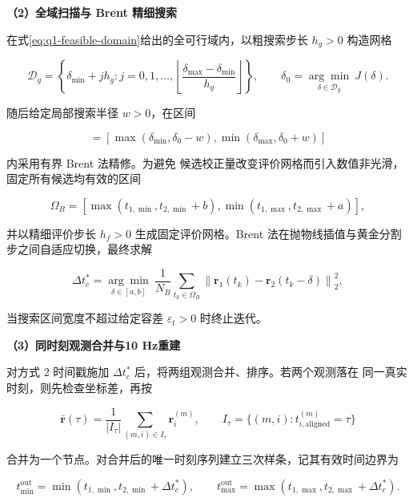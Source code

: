 \noindent\textbf{（2）全域扫描与 Brent 精细搜索}

在式\eqref{eq:q1-feasible-domain}给出的全可行域内，以粗搜索步长 \(h_g>0\)
构造网格

\begin{equation}
\mathcal D_g=\left\{\delta_{\min}+jh_g:
j=0,1,\ldots,
\left\lfloor\frac{\delta_{\max}-\delta_{\min}}{h_g}\right\rfloor\right\},
\qquad
\delta_0=\underset{\delta\in\mathcal D_g}{\arg\min}\ J(\delta).
\label{eq:q1-coarse-seed}
\end{equation}

随后给定局部搜索半径 \(w>0\)，在区间

\begin{equation}
[a,b]=\left[\max(\delta_{\min},\delta_0-w),
\min(\delta_{\max},\delta_0+w)\right]
\label{eq:q1-brent-bracket}
\end{equation}

内采用有界 Brent 法精修。为避免
候选校正量改变评价网格而引入数值非光滑，固定所有候选均有效的区间

\begin{equation}
\Omega_B=
\left[
\max(t_{1,\min},t_{2,\min}+b),
\min(t_{1,\max},t_{2,\max}+a)
\right],
\label{eq:q1-brent-overlap}
\end{equation}

并以精细评价步长 \(h_f>0\) 生成固定评价网格。Brent 法在抛物线插值与黄金分割
步之间自适应切换，最终求解

\begin{equation}
\Delta t_c^*=\underset{\delta\in[a,b]}{\arg\min}\
\frac{1}{N_B}\sum_{t_k\in\Omega_B}
\left\|\mathbf r_1(t_k)-\mathbf r_2(t_k-\delta)\right\|_2^2,
\label{eq:q1-brent-objective}
\end{equation}

当搜索区间宽度不超过给定容差 \(\varepsilon_t>0\) 时终止迭代。

\noindent\textbf{（3）同时刻观测合并与10 Hz重建}

对方式 2 时间戳施加 \(\Delta t_c^*\)
后，将两组观测合并、排序。若两个观测落在
同一真实时刻，则先检查坐标差，再按

\begin{equation}
\bar{\mathbf r}(\tau)=\frac{1}{|I_\tau|}
\sum_{(m,i)\in I_\tau}\mathbf r_i^{(m)},
\qquad
I_\tau=\{(m,i):t_{i,\mathrm{aligned}}^{(m)}=\tau\}
\label{eq:q1-merge-duplicate}
\end{equation}

合并为一个节点。对合并后的唯一时刻序列建立三次样条，记其有效时间边界为

\begin{equation}
t_{\min}^{\mathrm{out}}=\min(t_{1,\min},t_{2,\min}+\Delta t_c^*),\qquad
t_{\max}^{\mathrm{out}}=\max(t_{1,\max},t_{2,\max}+\Delta t_c^*).
\label{eq:q1-output-domain}
\end{equation}

